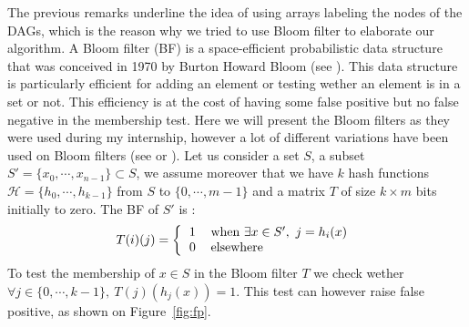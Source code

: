 The previous remarks underline the idea of using arrays labeling the nodes of the DAGs, which is the reason why we tried to use Bloom filter to elaborate our algorithm. A Bloom filter (BF) is a space-efficient probabilistic data structure that was conceived in 1970 by Burton Howard Bloom (see \cite{Bloom:1970:STH:362686.362692}). This data structure is particularly efficient for adding an element or testing wether an element is in a set or not. This efficiency is at the cost of having some false positive but no false negative in the membership test. Here we will present the Bloom filters as they were used during my internship, however a lot of different variations have been used on Bloom filters (see \cite{DBLP:journals/cn/DonnetBF10} or \cite{DBLP:conf/allerton/GoodrichM11}). Let us consider a set $S$, a subset $S' = \{x_0,\cdots,x_{n-1}\} \subset S$, we assume moreover that we have $k$ hash functions $\mathcal{H}=\{h_0,\cdots,h_{k-1}\}$ from $S$ to $\{0,\cdots,m-1\}$ and a matrix $T$ of size $k \times m$ bits initially to zero. The BF of $S'$ is :
\begin{equation*}
T(i)(j) = \left \{ 
\begin{tabular}{c l} 
$1$ & when $\exists x \in S',\ j = h_i(x)$ \\
0 & elsewhere
\end{tabular}
\right .
\end{equation*}
To test the membership of $x\in S$ in the Bloom filter $T$ we check wether $\forall j \in \{0,\cdots,k-1\},\ T(j)(h_j(x)) = 1$. This test can however raise 
false positive, as shown on Figure~\ref{fig:fp}.
